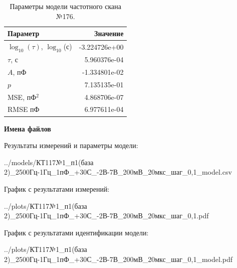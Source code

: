 \begin{table}[!ht]
    \centering
    \caption{Параметры модели частотного скана №176.}
    \begin{tabular}{|l|r|}
        \hline
        Параметр                                       & Значение                  \\ \hline
        $\log_{10}(\tau)$, $\log_{10}$(с)              & -3.224726e+00             \\ \hline
        $\tau$, с                                      & 5.960376e-04              \\ \hline
        $A$, пФ                                        & -1.334801e-02             \\ \hline
        $p$                                            & 7.135135e-01              \\ \hline
        MSE, пФ$^2$                                    & 4.868706e-07              \\ \hline
        RMSE пФ                                        & 6.977611e-04              \\ \hline
    \end{tabular}
    \label{table:frequency_scan_model_176}
\end{table}

\textbf{Имена файлов}

Результаты измерений и параметры модели:

\scriptsize../models/КТ117№1\_п1(база 2)\_2500Гц-1Гц\_1пФ\_+30С\_-2В-7В\_200мВ\_20мкс\_шаг\_0,1\_model.csv
\normalsize

График с результатами измерений:

\scriptsize../plots/КТ117№1\_п1(база 2)\_2500Гц-1Гц\_1пФ\_+30С\_-2В-7В\_200мВ\_20мкс\_шаг\_0,1.pdf
\normalsize

График с результатами идентификации модели:

\scriptsize../plots/КТ117№1\_п1(база 2)\_2500Гц-1Гц\_1пФ\_+30С\_-2В-7В\_200мВ\_20мкс\_шаг\_0,1\_model.pdf
\normalsize

